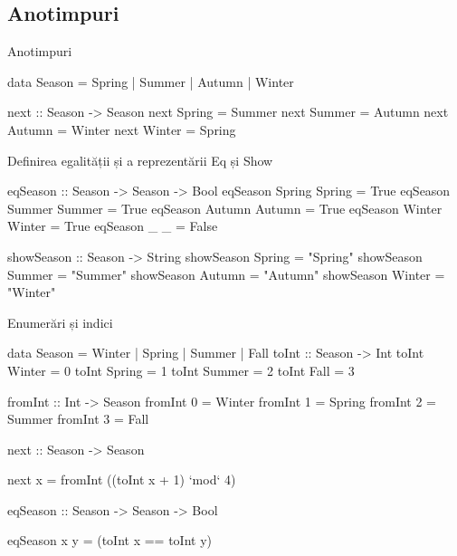 \documentclass[handout,xcolor=pdftex,romanian,colorlinks]{beamer}
\begin{document}
\subsection{Anotimpuri}

\begin{frame}[fragile]{Anotimpuri}
\begin{asciihs}
data Season = Spring | Summer | Autumn | Winter

next :: Season -> Season
next Spring = Summer
next Summer = Autumn
next Autumn = Winter
next Winter = Spring
\end{asciihs}
\end{frame}

\begin{frame}[fragile]{Definirea egalității și a reprezentării}
{Eq și Show}
\begin{asciihs}
eqSeason :: Season -> Season -> Bool
eqSeason Spring Spring = True
eqSeason Summer Summer = True
eqSeason Autumn Autumn = True
eqSeason Winter Winter = True
eqSeason _      _      = False


showSeason :: Season -> String
showSeason Spring = "Spring"
showSeason Summer = "Summer"
showSeason Autumn = "Autumn"
showSeason Winter = "Winter"
\end{asciihs}
\end{frame}


\begin{frame}[fragile]{Enumerări și indici}
\begin{asciihs}
  data Season = Winter | Spring | Summer | Fall
  toInt :: Season -> Int
  toInt Winter = 0
  toInt Spring = 1
  toInt Summer = 2
  toInt Fall   = 3

  fromInt :: Int -> Season
  fromInt 0 = Winter
  fromInt 1 = Spring
  fromInt 2 = Summer
  fromInt 3 = Fall

  next :: Season -> Season
\end{asciihs}
\vspace{-2ex}
\begin{asciihs}
  next x = fromInt ((toInt x + 1) `mod` 4)

\end{asciihs}
\begin{asciihs}
  eqSeason :: Season -> Season -> Bool
\end{asciihs}
\vspace{-2ex}
\begin{asciihs}
  eqSeason x y = (toInt x == toInt y)

\end{asciihs}
\end{frame}
\end{document}
